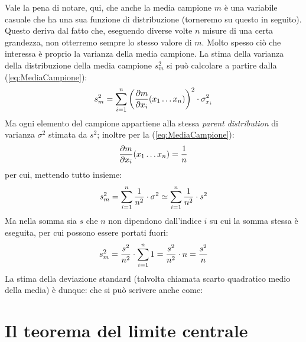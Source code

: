 Vale la pena di notare, qui, che anche la media campione $m$ \`e una variabile
casuale che ha una sua funzione di distribuzione (torneremo su questo
in seguito). Questo deriva dal fatto che, eseguendo diverse volte $n$ misure
di una certa grandezza, non otterremo sempre lo stesso valore di $m$.
Molto spesso ci\`o che interessa \`e proprio la varianza della media
campione.
La stima della varianza della distribuzione della media campione $s_m^2$
si pu\`o calcolare a partire dalla (\ref{eq:MediaCampione}):
$$
s^2_m  = \sum_{i=1}^n\left(\pfdereval{m}{x_i}{x_1 \ldots x_n} \right)^2
\cdot \sigma^2_{x_i}
$$
Ma ogni elemento del campione appartiene alla stessa \emph{parent distribution}
di varianza $\sigma^2$ stimata da $s^2$;
inoltre per la (\ref{eq:MediaCampione}):
$$
\pfdereval{m}{x_i}{x_1 \ldots x_n} = \frac{1}{n}
$$
per cui, mettendo tutto insieme:
$$
s^2_m = \dsum{\frac{1}{n^2} \cdot \sigma^2}{i}{1}{n} \simeq
\dsum{\frac{1}{n^2} \cdot s^2}{i}{1}{n}
$$
Ma nella somma sia $s$ che $n$ non dipendono dall'indice $i$ su cui
la somma stessa \`e eseguita, per cui possono essere portati fuori:
$$
s^2_m = \frac{s^2}{n^2} \cdot \dsum{1}{i}{1}{n} = 
\frac{s^2}{n^2} \cdot n = \frac{s^2}{n}
$$
La stima della deviazione standard (talvolta chiamata scarto quadratico medio
della media) \`e dunque:
che si pu\`o scrivere anche come:

\begin{exemplify}


\end{exemplify}


\section{Il teorema del limite centrale}

